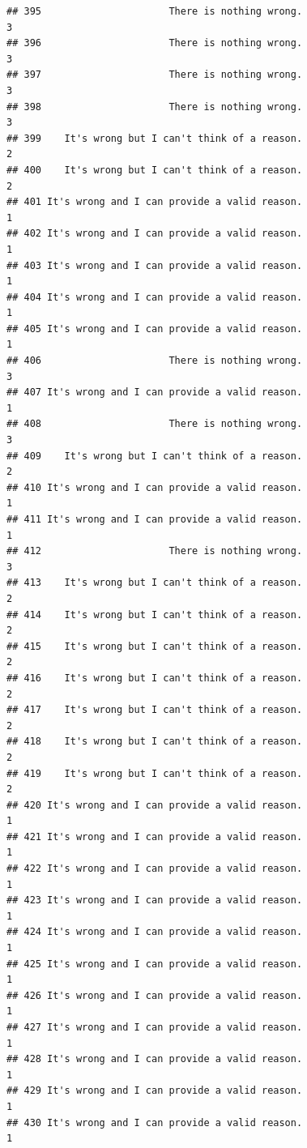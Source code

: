 \documentclass[
  american,
  man,floatsintext]{apa7}
\begin{document}
\begin{verbatim}
## 395                      There is nothing wrong.                    3
## 396                      There is nothing wrong.                    3
## 397                      There is nothing wrong.                    3
## 398                      There is nothing wrong.                    3
## 399    It's wrong but I can't think of a reason.                    2
## 400    It's wrong but I can't think of a reason.                    2
## 401 It's wrong and I can provide a valid reason.                    1
## 402 It's wrong and I can provide a valid reason.                    1
## 403 It's wrong and I can provide a valid reason.                    1
## 404 It's wrong and I can provide a valid reason.                    1
## 405 It's wrong and I can provide a valid reason.                    1
## 406                      There is nothing wrong.                    3
## 407 It's wrong and I can provide a valid reason.                    1
## 408                      There is nothing wrong.                    3
## 409    It's wrong but I can't think of a reason.                    2
## 410 It's wrong and I can provide a valid reason.                    1
## 411 It's wrong and I can provide a valid reason.                    1
## 412                      There is nothing wrong.                    3
## 413    It's wrong but I can't think of a reason.                    2
## 414    It's wrong but I can't think of a reason.                    2
## 415    It's wrong but I can't think of a reason.                    2
## 416    It's wrong but I can't think of a reason.                    2
## 417    It's wrong but I can't think of a reason.                    2
## 418    It's wrong but I can't think of a reason.                    2
## 419    It's wrong but I can't think of a reason.                    2
## 420 It's wrong and I can provide a valid reason.                    1
## 421 It's wrong and I can provide a valid reason.                    1
## 422 It's wrong and I can provide a valid reason.                    1
## 423 It's wrong and I can provide a valid reason.                    1
## 424 It's wrong and I can provide a valid reason.                    1
## 425 It's wrong and I can provide a valid reason.                    1
## 426 It's wrong and I can provide a valid reason.                    1
## 427 It's wrong and I can provide a valid reason.                    1
## 428 It's wrong and I can provide a valid reason.                    1
## 429 It's wrong and I can provide a valid reason.                    1
## 430 It's wrong and I can provide a valid reason.                    1

\end{verbatim}
\end{document}
